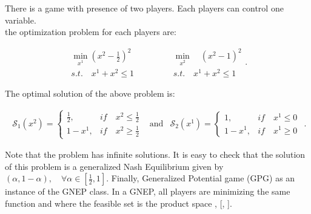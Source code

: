 \begin{example}
There is a game with presence of two players. Each players can control one variable. \\
the optimization problem for each players are:

\begin{equation}
    \begin{matrix}
\min_{x^{1}} \left( x^2 -\frac{1}{2}  \right)^2 & \ & \qquad & \min_{x^2} \quad \left( x^2-1 \right)^2\\
s.t. \quad x^1 + x^2 \le 1 & \ & \qquad & s.t. \quad x^1 + x^2 \le 1
\end{matrix}.
\end{equation}

The optimal solution of the above problem is:

\begin{equation}
\begin{matrix}
\mathcal{S}_1(x^2) = \left\{ \begin{array}{cl}
\frac{1}{2}, & if \quad x^2 \le \frac{1}{2} \\
1-x^1, & if \quad x^2 \ge \frac{1}{2}
\end{array} \right. 

& \text{and}&

\mathcal{S}_2(x^1) = \left\{ \begin{array}{cl}
1, & if \quad x^1 \le 0 \\
1-x^1, & if \quad x^1 \ge 0 
\end{array} \right.
\end{matrix}.
\end{equation}

Note that the problem has infinite solutions. It is easy to check that the solution of this problem is a generalized Nash Equilibrium given by $(\alpha, 1-\alpha), \quad \forall \alpha \in [\frac{1}{2},1]$. 
Finally, Generalized Potential game (GPG) as an instance of the GNEP class. In a GNEP, all players are minimizing the same function and where the feasible set is the product space , [\cite{20t_article}, \cite{40t_algorithms}].

\end{example}


